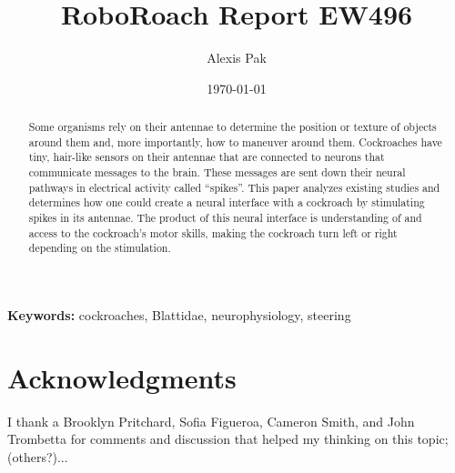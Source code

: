 \documentclass{article}
\title{RoboRoach Report EW496}
\author{Alexis Pak}
\date{\today}
\begin{document}
\maketitle
\begin{abstract}
Some organisms rely on their antennae to determine the position or texture of objects around them and, more importantly, how to maneuver around them. Cockroaches have tiny, hair-like sensors on their antennae that are connected to neurons that communicate messages to the brain. These messages are sent down their neural pathways in electrical activity called ``spikes''. This paper analyzes existing studies and determines how one could create a neural interface with a cockroach by stimulating spikes in its antennae. The product of this neural interface is understanding of and access to the cockroach's motor skills, making the cockroach turn left or right depending on the stimulation. 
\end{abstract}

{\scriptsize\textbf{Keywords:} cockroaches, Blattidae, neurophysiology, steering}






\section{Acknowledgments}
I thank a Brooklyn Pritchard, Sofia Figueroa, Cameron Smith, and John Trombetta for comments and discussion that helped my thinking on this topic; (others?)...


\end{document}
